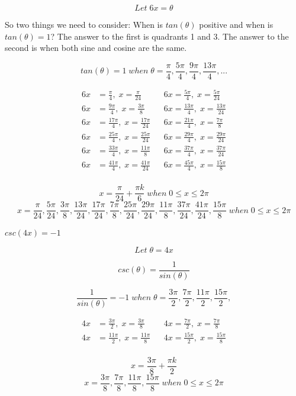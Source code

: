 \documentclass[10pt,letterpaper]{amspset}
\begin{document}
\begin{solution}
    \[Let \; 6x = \theta\] 

    So two things we need to consider: When is $tan(\theta)$ positive and when is $tan(\theta) = 1$? The answer to the first is quadrants 1 and 3. The answer to the second is when both sine and cosine are the same. 

    \[tan(\theta) = 1 \; when \; \theta = \frac{\pi}{4}, \frac{5\pi}{4}, \frac{9\pi}{4}, \frac{13\pi}{4}, ... \]
    
    \begin{align}
        6x &= \frac{\pi}{4}, \; x = \frac{\pi}{24} && 6x = \frac{5\pi}{4}, \; x = \frac{5\pi}{24}\\[+3mm]
        6x &= \frac{9\pi}{4}, \; x = \frac{3\pi}{8} && 6x = \frac{13\pi}{4}, \; x = \frac{13\pi}{24}\\[+3mm]
        6x &= \frac{17\pi}{4}, \; x = \frac{17\pi}{24} && 6x = \frac{21\pi}{4}, \; x = \frac{7\pi}{8}\\[+3mm]
        6x &= \frac{25\pi}{4}, \; x = \frac{25\pi}{24} && 6x = \frac{29\pi}{4}, \; x = \frac{29\pi}{24}\\[+3mm]
        6x &= \frac{33\pi}{4}, \; x = \frac{11\pi}{8} && 6x = \frac{37\pi}{4}, \; x = \frac{37\pi}{24}\\[+3mm]
        6x &= \frac{41\pi}{4}, \; x = \frac{41\pi}{24} && 6x = \frac{45\pi}{4}, \; x = \frac{15\pi}{8}\\
    \end{align}
    
\[\boxed{ x = \frac{\pi}{24} + \frac{\pi k}{6}  \; when \; 0 \leq x \leq 2\pi }\]
\[\boxed{ x = \frac{\pi}{24}, \frac{5\pi}{24}, \frac{3\pi}{8}, \frac{13\pi}{24}, \frac{17\pi}{24}, \frac{7\pi}{8}, \frac{25\pi}{24}, \frac{29\pi}{24}, \frac{11\pi}{8}, \frac{37\pi}{24}, \frac{41\pi}{24}, \frac{15\pi}{8} \; when \; 0 \leq x \leq 2\pi   }  \]
\end{solution}


\pagebreak


\begin{problem}[5]
    $csc(4x) = -1$
\end{problem}

\begin{solution}
   \[Let \; \theta = 4x\]
   
    \[csc(\theta) = \frac{1}{sin(\theta)}\]
    
    \[\frac{1}{sin(\theta)} = -1 \; when \; \theta = \frac{3\pi}{2}, \frac{7\pi}{2}, \frac{11\pi}{2}, \frac{15\pi}{2},\]
    
    \begin{align}
        4x &= \frac{3\pi}{2}, \; x = \frac{3\pi}{8} && 4x = \frac{7\pi}{2}, \; x = \frac{7\pi}{8}\\[+3mm]
        4x &= \frac{11\pi}{2}, \; x = \frac{11\pi}{8} && 4x = \frac{15\pi}{2}, \; x = \frac{15\pi}{8}\\
    \end{align}
    
\[\boxed{ x = \frac{3\pi}{8} + \frac{\pi k}{2}}\]
\[\boxed{ x = \frac{3\pi}{8}, \frac{7\pi}{8}, \frac{11\pi}{8}, \frac{15\pi}{8} \; when \; 0 \leq x \leq 2\pi  }\]
\end{solution}
\end{document}
